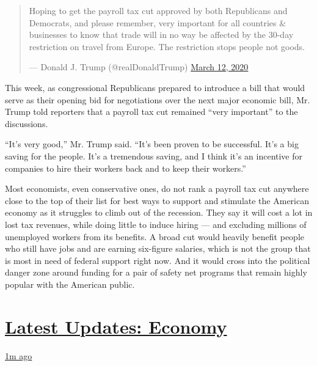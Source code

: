 \begin{quote}
Hoping to get the payroll tax cut approved by both Republicans and
Democrats, and please remember, very important for all countries \&
businesses to know that trade will in no way be affected by the 30-day
restriction on travel from Europe. The restriction stops people not
goods.

--- Donald J. Trump (@realDonaldTrump)
\href{https://twitter.com/realDonaldTrump/status/1237924658185469954?ref_src=twsrc\%5Etfw}{March
12, 2020}
\end{quote}

This week, as congressional Republicans prepared to introduce a bill
that would serve as their opening bid for negotiations over the next
major economic bill, Mr. Trump told reporters that a payroll tax cut
remained ``very important'' to the discussions.

``It's very good,'' Mr. Trump said. ``It's been proven to be successful.
It's a big saving for the people. It's a tremendous saving, and I think
it's an incentive for companies to hire their workers back and to keep
their workers.''

Most economists, even conservative ones, do not rank a payroll tax cut
anywhere close to the top of their list for best ways to support and
stimulate the American economy as it struggles to climb out of the
recession. They say it will cost a lot in lost tax revenues, while doing
little to induce hiring --- and excluding millions of unemployed workers
from its benefits. A broad cut would heavily benefit people who still
have jobs and are earning six-figure salaries, which is not the group
that is most in need of federal support right now. And it would cross
into the political danger zone around funding for a pair of safety net
programs that remain highly popular with the American public.

\hypertarget{latest-updates-economy}{%
\section{\texorpdfstring{\href{https://www.nytimes3xbfgragh.onion/live/2020/08/04/business/stock-market-today-coronavirus?action=click\&pgtype=Article\&state=default\&region=MAIN_CONTENT_1\&context=storylines_live_updates}{Latest
Updates:
Economy}}{Latest Updates: Economy}}\label{latest-updates-economy}}

\href{https://www.nytimes3xbfgragh.onion/live/2020/08/04/business/stock-market-today-coronavirus?action=click\&pgtype=Article\&state=default\&region=MAIN_CONTENT_1\&context=storylines_live_updates\#the-ad-giant-publicis-has-parted-ways-with-an-executive-over-his-virus-tweets}{1m
ago}


